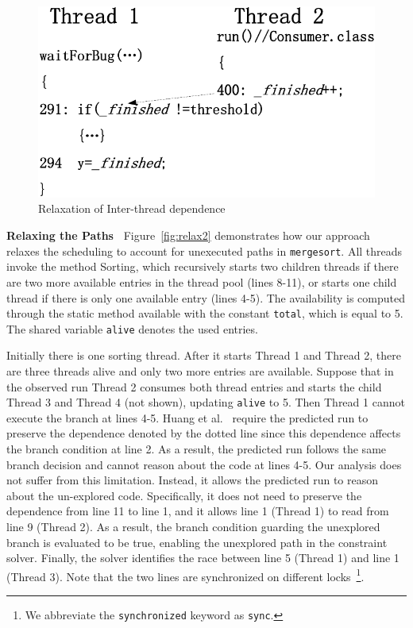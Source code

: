  

\begin{figure}[htp]
\centering
\includegraphics[scale=0.45]{figs/Visio-bbuffer.pdf}
\caption{Relaxation of Inter-thread dependence}\label{fig:relax1}
\vspace{-1em}
\end{figure}

{\bf Relaxing the Paths\ } Figure~\ref{fig:relax2} demonstrates how our 
approach relaxes the scheduling to account for  unexecuted paths in 
{\tt mergesort}. 
All threads invoke the method {\sf Sorting}, which recursively starts 
two children threads if there are two more available entries in the 
thread pool (lines 8-11), or starts one child thread if there is only 
one available entry (lines 4-5).  The availability is computed through 
the static method {\sf available} with the constant {\tt total}, which is equal to 5. The shared variable {\tt alive} denotes the used entries.

 
Initially there is one sorting thread. After it starts Thread 1 and 
Thread 2, there are three threads alive and only two more 
entries are available. Suppose that in the observed run Thread 2 
consumes both thread entries and starts the child Thread 3 
and Thread 4 (not shown), updating {\tt alive} to 5. Then Thread 1 
cannot execute the branch at lines 4-5. Huang et al.~\cite{pldi14} require the predicted run to preserve the dependence denoted by the dotted line since this dependence affects the branch condition at line 2. As a result, the predicted run follows the same branch decision and cannot reason about the code at lines 4-5. Our analysis does not suffer from this limitation. Instead, it allows the predicted run to reason about the un-explored code. Specifically, it does not need to preserve the dependence from line 11 to line 1, and it allows line 1 (Thread 1) to read from line 9 (Thread 2). As a result, the branch condition guarding the unexplored branch is evaluated to be true, enabling the unexplored path in the constraint solver. Finally, the solver identifies the race between line 5 (Thread 1) and line 1 (Thread 3). Note that the two lines are synchronized on different locks~\footnote{We abbreviate the {\tt synchronized} keyword as {\tt sync}.
}. 

